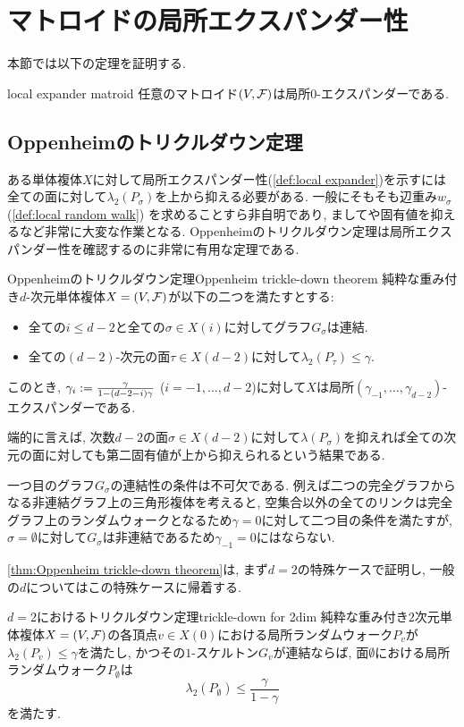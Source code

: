 \section{マトロイドの局所エクスパンダー性}
本節では以下の定理を証明する.
\begin{lemma}{}{local expander matroid}
    任意のマトロイド$(V,\mathcal{F})$は局所$0$-エクスパンダーである.
\end{lemma}


\subsection{Oppenheimのトリクルダウン定理}
ある単体複体$X$に対して局所エクスパンダー性(\cref{def:local expander})を示すには全ての面に対して$\lambda_2(P_\sigma)$を上から抑える必要がある.
一般にそもそも辺重み$w_\sigma$ (\cref{def:local random walk}) を求めることすら非自明であり, ましてや固有値を抑えるなど非常に大変な作業となる.
Oppenheimのトリクルダウン定理は局所エクスパンダー性を確認するのに非常に有用な定理である.
\begin{theorem}{Oppenheimのトリクルダウン定理}{Oppenheim trickle-down theorem}
    純粋な重み付き$d$-次元単体複体$X = (V,\mathcal{F})$が以下の二つを満たすとする:
    \begin{itemize}
    \item 全ての$i\le d-2$と全ての$\sigma\in X(i)$に対してグラフ$G_\sigma$は連結.
    \item 全ての$(d-2)$-次元の面$\tau \in X(d-2)$に対して$\lambda_2(P_\tau) \le \gamma$.
    \end{itemize}
    このとき, $\gamma_i \mathrel{:=} \frac{\gamma}{1-(d-2-i)\gamma}$ ($i=-1,\dots,d-2$)に対して$X$は局所$(\gamma_{-1},\dots,\gamma_{d-2})$-エクスパンダーである.
\end{theorem}
端的に言えば, 次数$d-2$の面$\sigma \in X(d-2)$に対して$\lambda(P_\sigma)$を抑えれば全ての次元の面に対しても第二固有値が上から抑えられるという結果である.

一つ目のグラフ$G_\sigma$の連結性の条件は不可欠である.
例えば二つの完全グラフからなる非連結グラフ上の三角形複体を考えると,
空集合以外の全てのリンクは完全グラフ上のランダムウォークとなるため$\gamma=0$に対して二つ目の条件を満たすが, $\sigma=\emptyset$に対して$G_\sigma$は非連結であるため$\gamma_{-1}=0$にはならない.


\cref{thm:Oppenheim trickle-down theorem}は, まず$d=2$の特殊ケースで証明し, 一般の$d$についてはこの特殊ケースに帰着する.
%
\begin{lemma}{\texorpdfstring{$d=2$}{2次元}におけるトリクルダウン定理}{trickle-down for 2dim}
    純粋な重み付き$2$次元単体複体$X=(V,\mathcal{F})$の各頂点$v\in X(0)$における局所ランダムウォーク$P_v$が$\lambda_2(P_v) \le \gamma$を満たし, かつその$1$-スケルトン$G_v$が連結ならば, 面$\emptyset$における局所ランダムウォーク$P_\emptyset$は
    \[
        \lambda_2(P_\emptyset) \le \frac{\gamma}{1-\gamma}
    \]
    を満たす.
\end{lemma}

